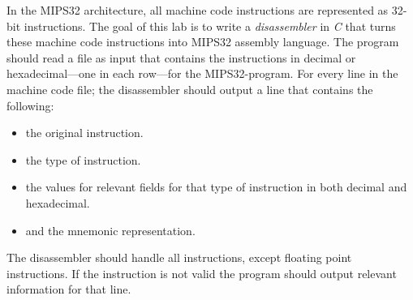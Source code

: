 In the MIPS32 architecture, all machine code instructions are represented as 32-bit instructions.
The goal of this lab is to write a \emph{disassembler} in \emph{C} that turns these machine code instructions into MIPS32 assembly language.
The program should read a file as input that contains the instructions in decimal or hexadecimal---one in each row---for the MIPS32-program. For every line in the machine code file; the disassembler should output a line that contains the following:
\begin{itemize}
\item the original instruction.
\item the type of instruction.
\item the values for relevant fields for that type of instruction in both decimal and hexadecimal.
\item and the mnemonic representation.
\end{itemize}

The disassembler should handle all instructions, except floating point instructions.
If the instruction is not valid the program should output relevant information for that line.